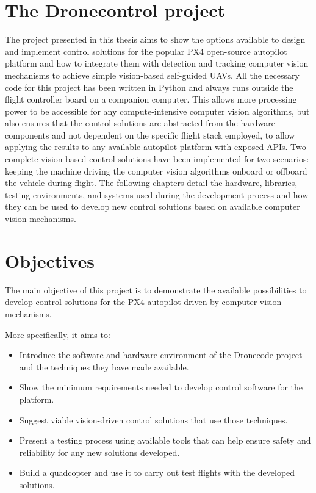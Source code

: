 \section{The Dronecontrol project}

The project presented in this thesis aims to show the options available to design and implement control solutions for the popular PX4 open-source autopilot platform and how to integrate them with detection and tracking computer vision mechanisms to achieve simple vision-based self-guided UAVs.
All the necessary code for this project has been written in Python and always runs outside the flight controller board on a companion computer.
This allows more processing power to be accessible for any compute-intensive computer vision algorithms,
but also ensures that the control solutions are abstracted from the hardware components and not dependent on the specific flight stack employed, 
to allow applying the results to any available autopilot platform with exposed APIs.
Two complete vision-based control solutions have been implemented for two scenarios: keeping the machine driving the computer vision algorithms onboard or offboard the vehicle during flight.
The following chapters detail the hardware, libraries, testing environments, and systems used during the development process and how they can be used to develop new control solutions based on available computer vision mechanisms.

\section{Objectives}
\label{sec:objetives}

The main objective of this project is to demonstrate the available possibilities to develop control solutions for the PX4 autopilot driven by computer vision mechanisms.

More specifically, it aims to:
\begin{itemize}
    \item Introduce the software and hardware environment of the Dronecode project and the techniques they have made available.
    \item Show the minimum requirements needed to develop control software for the platform.
    \item Suggest viable vision-driven control solutions that use those techniques.
    \item Present a testing process using available tools that can help ensure safety and reliability for any new solutions developed.
    \item Build a quadcopter and use it to carry out test flights with the developed solutions.
\end{itemize}


